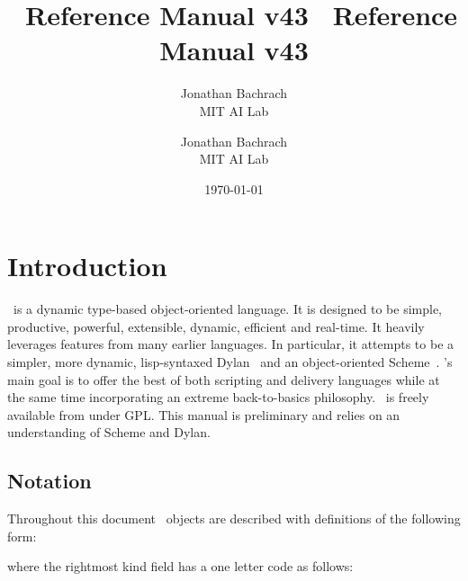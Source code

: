 \documentclass[twoside,twocolumn,9pt]{extarticle}
\begin{document}
\label{top_node}

\T\sloppy    %

\T\title{{\Huge \goo\ Reference Manual v43 }}
\T\author{{\huge Jonathan Bachrach} \\ {\Large MIT AI Lab}}
\W\title{{\huge \goo\ Reference Manual v43 }}
\W\author{{\Large Jonathan Bachrach} \\ {\Large MIT AI Lab}}
\date{\today}


\maketitle

\section{Introduction}

\goo\ is a dynamic type-based object-oriented language.  It is
designed to be simple, productive, powerful, extensible, dynamic,
efficient and real-time.  It heavily leverages features from many
earlier languages.  In particular, it attempts to be a simpler,
more dynamic, lisp-syntaxed Dylan~\cite{Shalit:1996} and an object-oriented 
Scheme~\cite{Kelsey:Clinger:Rees:hosc:1998}.
\goo's main goal is to offer the best of both scripting and
delivery languages while at the same time 
incorporating an extreme back-to-basics philosophy.
\goo\ is freely available from  under GPL.
This manual is preliminary and relies on an understanding
of Scheme and Dylan.

\subsection{Notation}

Throughout this document \goo\ objects are described with definitions
of the following form:

\begin{defs}
\end{defs}

where the rightmost kind field has a one letter code as follows:

\begin{defs}
\end{defs}
\end{document}
